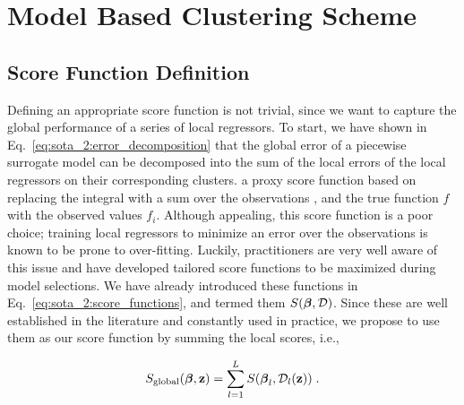 \section{Model Based Clustering Scheme}
\label{sc:mc_algorithm}



\subsection{Score Function Definition}
\label{sec:clustering:mb:score}

Defining an appropriate score function is not trivial, since we want to capture the global performance of a series of local regressors. To start, we have shown in Eq.~\eqref{eq:sota_2:error_decomposition} that the global error of a piecewise surrogate model can be decomposed into the sum of the local errors of the local regressors on their corresponding clusters.  a proxy score function based on replacing the integral  with a sum over the observations , and the true function $f$ with the observed values $f_i$. Although appealing, this score function is a poor choice; training local regressors to minimize an error over the observations is known to be prone to over-fitting. Luckily, practitioners are very well aware of this issue and have developed tailored score functions to be maximized during model selections. We have already introduced these functions in Eq.~\eqref{eq:sota_2:score_functions}, and termed them $S(\boldsymbol{\beta},\mathcal{D})$. Since these are well established in the literature and constantly used in practice, we propose to use them as our score function by summing the local scores, i.e.,

\begin{equation}
  S_{\mathrm{global}}(\boldsymbol{\beta}, \mathbf{z}) = \displaystyle \sum_{l=1}^{L} S(\boldsymbol{\beta}_l, \mathcal{D}_l(\mathbf{z})) \;.
  \label{eq:clustering:global_score}
\end{equation}

